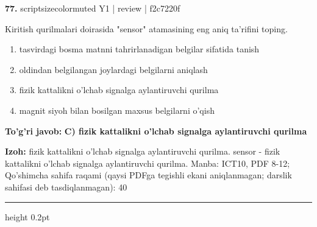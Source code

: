 \documentclass[10pt,a4paper]{article}
\begin{document}
{\bfseries\sffamily\color{ink} 77.} {scriptsizecolor{muted} Y1 | review | f2c7220f}
\par
Kiritish qurilmalari doirasida "sensor" atamasining eng aniq ta'rifini toping.
\begin{enumerate}[label=\Alph*),leftmargin=9mm]
\item tasvirdagi bosma matnni tahrirlanadigan belgilar sifatida tanish
\item oldindan belgilangan joylardagi belgilarni aniqlash
\item fizik kattalikni o'lchab signalga aylantiruvchi qurilma
\item magnit siyoh bilan bosilgan maxsus belgilarni o'qish
\end{enumerate}
\begin{tcolorbox}[enhanced,breakable,colback=teal!4,colframe=teal!60!black,boxrule=0.45pt,arc=1.2mm,left=2.7mm,right=2.7mm,top=1.8mm,bottom=1.8mm,before skip=2mm,after skip=2mm]
{\bfseries\sffamily\color{teal}To'g'ri javob:} \textbf{C) fizik kattalikni o'lchab signalga aylantiruvchi qurilma}
\par\smallskip
{\bfseries Izoh:} fizik kattalikni o'lchab signalga aylantiruvchi qurilma. sensor - fizik kattalikni o'lchab signalga aylantiruvchi qurilma. Manba: ICT10, PDF 8-12; Qo'shimcha sahifa raqami (qaysi PDFga tegishli ekani aniqlanmagan; darslik sahifasi deb tasdiqlanmagan): 40
\end{tcolorbox}
\vspace{2mm}\hrule height 0.2pt\vspace{3mm}
\end{document}
